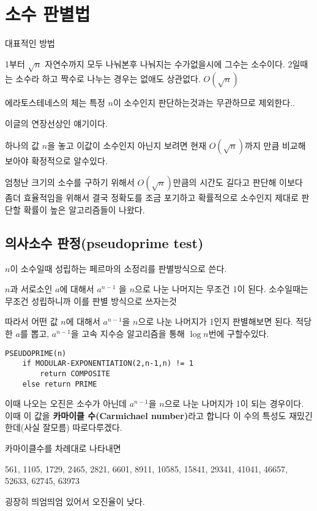 \section{소수 판별법}

대표적인 방법

 1부터 $\sqrt{n}$ 자연수까지 모두 나눠본후 나눠지는 수가없을시에 그수는 소수이다. 2일때는 소수라 하고 짝수로 나누는 경우는 없애도 상관없다.
$O(\sqrt{n})$

에라토스테네스의 체는 특정 $n$이 소수인지 판단하는것과는 무관하므로 제외한다..


이글의 연장선상인 얘기이다.

하나의 값 $n$을 놓고 이값이 소수인지 아닌지 보려면 현재 $O(\sqrt{n})$까지 만큼 비교해 보아야 확정적으로 알수있다.

엄청난 크기의 소수를 구하기 위해서 $O(\sqrt{n})$만큼의 시간도 길다고 판단해
이보다 좀더 효율적임을 위해서 결국 정확도를 조금 포기하고 확률적으로 소수인지 제대로 판단할 확률이 높은 알고리즘들이 나왔다.

\subsection{의사소수 판정(pseudoprime test)}

$n$이 소수일때 성립하는 페르마의 소정리를 판별방식으로 쓴다.

$n$과 서로소인 $a$에 대해서 $a^{n-1}$ 을 $n$으로 나눈 나머지는 무조건 1이 된다. 소수일때는 무조건 성립하니까 이를 판별 방식으로 쓰자는것

따라서 어떤 값 $n$에 대해서 $a^{n-1}$을 $n$으로 나눈 나머지가 1인지 판별해보면 된다.
적당한 $a$를 뽑고, $a^{n-1}$을
고속 지수승 알고리즘을 통해 $\log{n}$번에 구할수있다.

\begin{lstlisting}[style = CStyle]
PSEUDOPRIME(n)
    if MODULAR-EXPONENTIATION(2,n-1,n) != 1
        return COMPOSITE
    else return PRIME
\end{lstlisting}



이때 나오는 오진은 소수가 아닌데 $a^{n-1}$을 $n$으로 나눈 나머지가 1이 되는 경우이다.
이때 이 값을 \textbf{카마이클 수(Carmichael number)}라고 합니다 이 수의 특성도 재밌긴한데(사실 잘모름) 따로다루겠다.

카마이클수를 차례대로 나타내면

561, 1105, 1729, 2465, 2821, 6601, 8911, 10585, 15841, 29341, 41041, 46657, 52633, 62745, 63973

굉장히 띄엄띄엄 있어서 오진율이 낮다.




